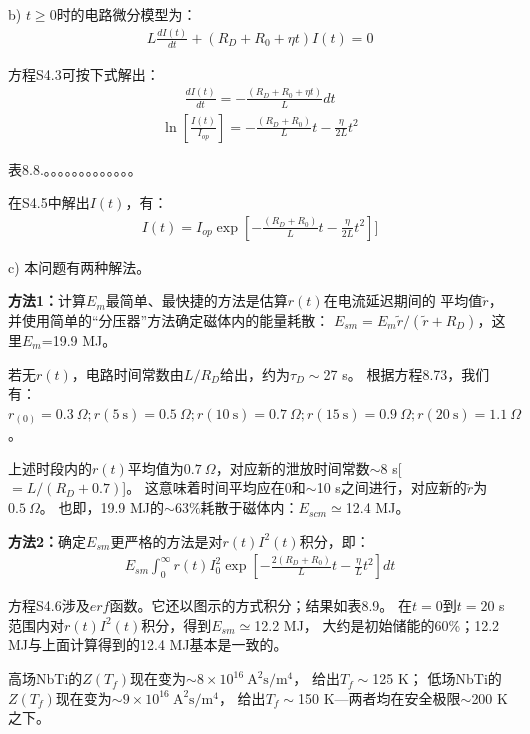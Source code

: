 b) $t\ge 0$时的电路微分模型为：
\begin{align*}%
L\frac{dI(t)}{dt}+(R_D+R_0+\eta t)I(t)=0
\end{align*}

方程S4.3可按下式解出：
\begin{align*}%
\frac{dI(t)}{dt}=-\frac{(R_D+R_0+\eta t)}{L}dt \tag{S4.4}
\end{align*}
\begin{align*}%
\ln\left[\frac{I(t)}{I_{op}}\right]=-\frac{(R_D+R_0)}{L}t-\frac{\eta}{2L}t^2 \tag{S4.5}
\end{align*}

表8.8.。。。。。。。。。。。。。

在S4.5中解出$I(t)$，有：
\begin{align*}%
I(t)=I_{op}\exp\left[-\frac{(R_D+R_0)}{L}t-\frac{\eta}{2L}t^2\right] ]\tag{8.74}
\end{align*}

c) 本问题有两种解法。

\textbf{方法1：}\quad 计算$E_m$最简单、最快捷的方法是估算$r(t)$在电流延迟期间的
平均值$\tilde{r}$，并使用简单的“分压器”方法确定磁体内的能量耗散：
$E_{sm}=E_m\tilde{r}/(\tilde{r}+R_D)$，这里$E_m$=19.9 MJ。

若无$r(t)$，电路时间常数由$L/R_D$给出，约为$\tau_D\sim$27 s。
根据方程8.73，我们有：$r_(0)=0.3\ \Omega;r(5\ \mathrm{s})=0.5\ \Omega;
r(10\ \mathrm{s})=0.7\ \Omega;r(15\ \mathrm{s})=0.9\ \Omega;
r(20\ \mathrm{s})=1.1\ \Omega$。

上述时段内的$r(t)$平均值为$0.7\ \Omega$，对应新的泄放时间常数$\sim8$ s[$=L/(R_D+0.7)$]。
这意味着时间平均应在0和$\sim$10 s之间进行，对应新的$\tilde{r}$为$0.5\ \Omega$。
也即，19.9 MJ的$\sim 63\%$耗散于磁体内：$E_{scm}\simeq$12.4 MJ。

\textbf{方法2：}\quad 确定$E_{sm}$更严格的方法是对$r(t)I^2(t)$积分，即：
\begin{align*}%
E_{sm}\int_{0}^{\infty}r(t)I_{0}^{2}\exp\left[-\frac{2(R_D+R_0)}{L}t-\frac{\eta}{L}t^2\right]dt\tag{S4.6}
\end{align*}

方程S4.6涉及$erf$函数。它还以图示的方式积分；结果如表8.9。
在$t=0$到$t=20$ s范围内对$r(t)I^2(t)$积分，得到$E_{sm}\simeq$12.2 MJ，
大约是初始储能的60\%；12.2 MJ与上面计算得到的12.4 MJ基本是一致的。

高场NbTi的$Z(T_f)$现在变为$\sim 8\times 10^{16}\ \mathrm{A^2 s/m^4}$，
给出$T_f\sim$125 K；
低场NbTi的$Z(T_f)$现在变为$\sim 9\times 10^{16}\ \mathrm{A^2 s/m^4}$，
给出$T_f\sim$150 K---两者均在安全极限$\sim$200 K之下。


